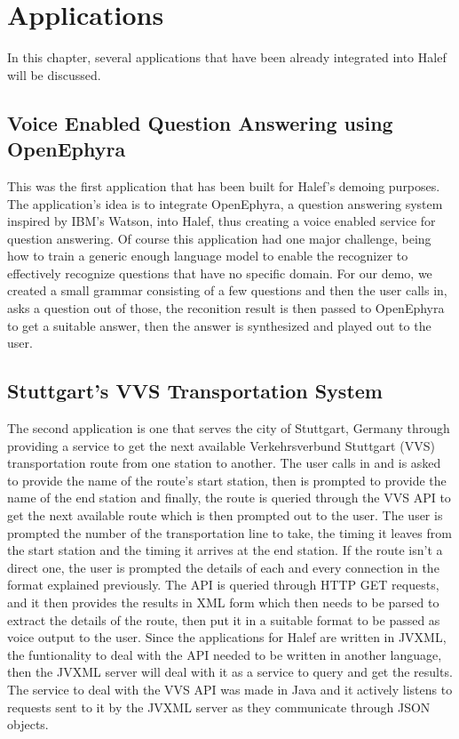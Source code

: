 \chapter{Applications}
\label{chap:applications}
In this chapter, several applications that have been already integrated into Halef will be discussed.

\section{Voice Enabled Question Answering using OpenEphyra}
This was the first application that has been built for Halef's demoing purposes.
The application's idea is to integrate OpenEphyra, a question answering system inspired by IBM's Watson, into Halef, thus creating a voice enabled service for question answering.
Of course this application had one major challenge, being how to train a generic enough language model to enable the recognizer to effectively recognize questions that have no specific domain.
For our demo, we created a small grammar consisting of a few questions and then the user calls in, asks a question out of those, the reconition result is then passed to OpenEphyra to get a suitable answer, then the answer is synthesized and played out to the user.

\section{Stuttgart's VVS Transportation System}
The second application is one that serves the city of Stuttgart, Germany through providing a service to get the next available Verkehrsverbund Stuttgart (VVS) transportation route from one station to another.
The user calls in and is asked to provide the name of the route's start station, then is prompted to provide the name of the end station and finally, the route is queried through the VVS API to get the next available route which is then prompted out to the user.
The user is prompted the number of the transportation line to take, the timing it leaves from the start station and the timing it arrives at the end station.
If the route isn't a direct one, the user is prompted the details of each and every connection in the format explained previously.
The API is queried through HTTP GET requests, and it then provides the results in XML form which then needs to be parsed to extract the details of the route, then put it in a suitable format to be passed as voice output to the user.
Since the applications for Halef are written in JVXML, the funtionality to deal with the API needed to be written in another language, then the JVXML server will deal with it as a service to query and get the results.
The service to deal with the VVS API was made in Java and it actively listens to requests sent to it by the JVXML server as they communicate through JSON objects.
